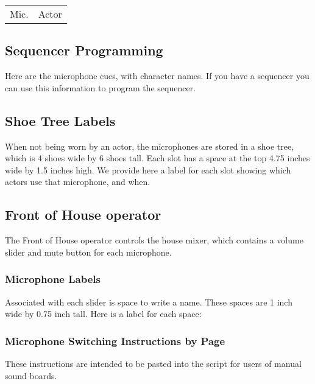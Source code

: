 \documentclass[letterpaper]{article}
\begin{document}
\begin{center}
\begin{longtable}{|l|l|}
\hline Mic. & Actor \endhead \hline

\end{longtable}
\end{center}

\subsection {Sequencer Programming}

Here are the microphone cues, with character names.  If you
have a sequencer you can use this information to program
the sequencer.



\subsection {Shoe Tree Labels}

When not being worn by an actor, the microphones are stored in a shoe tree,
which is 4 shoes wide by 6 shoes tall.  
Each slot has a space at the top 4.75 inches wide
by 1.5 inches high.  We provide here a label for each slot showing which
actors use that microphone, and when.

{\Large

}

\subsection {Front of House operator}

The Front of House operator controls the house mixer, 
which contains a volume slider
and mute button for each microphone.  

\subsubsection {Microphone Labels}

Associated with each slider is space to write a name.  
These spaces are 1 inch wide by 0.75 inch tall.  
Here is a label for each space:

{\Large

}

\subsubsection {Microphone Switching Instructions by Page}

These instructions are intended to be pasted into the script
for users of manual sound boards.


\end{document}
